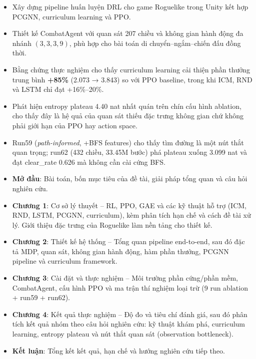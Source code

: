 \renewcommand{\labelitemi}{$-$}
\begin{itemize}
    \item Xây dựng pipeline huấn luyện DRL cho game Roguelike trong Unity kết hợp PCGNN, curriculum learning và PPO.
    \item Thiết kế CombatAgent với quan sát 207 chiều và không gian hành động đa nhánh $(3,3,3,9)$, phù hợp cho bài toán di chuyển--ngắm--chiến đấu đồng thời.
    \item Bằng chứng thực nghiệm cho thấy curriculum learning cải thiện phần thưởng trung bình \textbf{+85\%} (2.073 → 3.843) so với PPO baseline, trong khi ICM, RND và LSTM chỉ đạt +16\%--20\%.
    \item Phát hiện entropy plateau 4.40 nat nhất quán trên chín cấu hình ablation, cho thấy đây là hệ quả của quan sát thiếu đặc trưng không gian chứ không phải giới hạn của PPO hay action space.
    \item Run59 (\emph{path-informed}, +BFS features) cho thấy tìm đường là một nút thắt quan trọng; run62 (432 chiều, 33.45M bước) phá plateau xuống 3.099 nat và đạt clear\_rate 0.626 mà không cần cài cứng BFS.
\end{itemize}

\vspace{0.3cm}

\vspace{0.5cm}

\renewcommand{\labelitemi}{$-$}
\begin{itemize}
	\item \textbf{Mở đầu}: Bài toán, bốn mục tiêu của đề tài, giải pháp tổng quan và câu hỏi nghiên cứu.
	\item \textbf{Chương 1}: Cơ sở lý thuyết -- RL, PPO, GAE và các kỹ thuật hỗ trợ (ICM, RND, LSTM, PCGNN, curriculum), kèm phân tích hạn chế và cách đề tài xử lý. Giới thiệu đặc trưng của Roguelike làm nền tảng cho thiết kế.
	\item \textbf{Chương 2}: Thiết kế hệ thống -- Tổng quan pipeline end-to-end, sau đó đặc tả MDP, quan sát, không gian hành động, hàm phần thưởng, PCGNN pipeline và curriculum framework.
	\item \textbf{Chương 3}: Cài đặt và thực nghiệm -- Môi trường phần cứng/phần mềm, CombatAgent, cấu hình PPO và ma trận thí nghiệm loại trừ (9 run ablation + run59 + run62).
	\item \textbf{Chương 4}: Kết quả thực nghiệm -- Độ đo và tiêu chí đánh giá, sau đó phân tích kết quả nhóm theo câu hỏi nghiên cứu: kỹ thuật khám phá, curriculum learning, entropy plateau và nút thắt quan sát (observation bottleneck).
	\item \textbf{Kết luận}: Tổng kết kết quả, hạn chế và hướng nghiên cứu tiếp theo.
\end{itemize}
